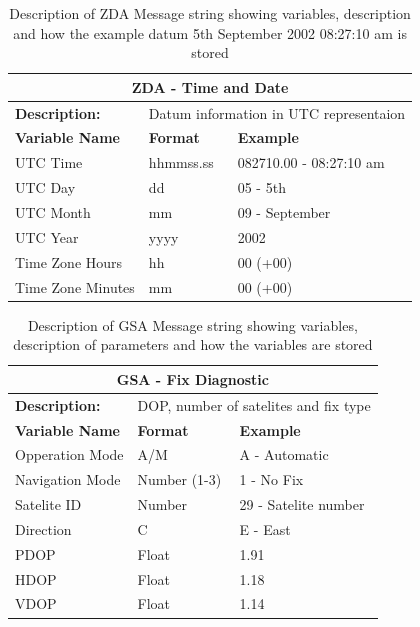 \begin{table}[H]
    \centering
    \caption{Description of ZDA Message string showing variables, description and how the example datum 5th September 2002 08:27:10 am is stored}
    \begin{tabular}{|l|l|l|}
    \hline
     \multicolumn{3}{|c|}{\textbf{ZDA - Time and Date}}\\
     \hline
    \textbf{Description:} & \multicolumn{2}{l|}{Datum information in UTC representaion}\\
     \hline
     \textbf{Variable Name} & \textbf{Format}& \textbf{Example} \\
     \hline
      UTC Time & hhmmss.ss & 082710.00 - 08:27:10 am\\
      \hline
      UTC Day  & dd & 05 - 5th \\
      \hline
      UTC Month & mm & 09 - September\\
      \hline
      UTC Year & yyyy & 2002 \\
      \hline
      Time Zone Hours & hh & 00 (+00)\\
      \hline
      Time Zone Minutes & mm & 00 (+00)\\
      \hline
    \end{tabular}
    \label{tab:NMEA_ZDA}
\end{table}

\begin{table}[H]
    \centering
    \caption{Description of GSA Message string showing variables, description of parameters and how the variables are stored}
    \begin{tabular}{|l|l|l|}
    \hline
     \multicolumn{3}{|c|}{\textbf{GSA - Fix Diagnostic}}\\
     \hline
    \textbf{Description:} & \multicolumn{2}{l|}{ DOP, number of satelites and fix type}\\
     \hline
     \textbf{Variable Name} & \textbf{Format}& \textbf{Example} \\
     \hline
     Opperation Mode & A/M & A - Automatic\\
      \hline
     Navigation Mode  & Number (1-3) & 1 - No Fix \\
      \hline
      Satelite ID & Number  & 29 - Satelite number \\
      \hline
      Direction & C & E - East \\
      \hline
      PDOP & Float & 1.91 \\
      \hline
      HDOP & Float & 1.18 \\
      \hline
      VDOP & Float & 1.14 \\
      \hline
    \end{tabular}

    \label{tab:NMEA_GSA}
\end{table}

